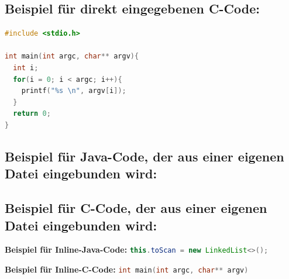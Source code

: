\subsection*{Beispiel für direkt eingegebenen C-Code:}

\begin{lstlisting}[language=c]
#include <stdio.h>

int main(int argc, char** argv){
  int i;
  for(i = 0; i < argc; i++){
    printf("%s \n", argv[i]);
  }
  return 0;
}
\end{lstlisting}


\subsection*{Beispiel für Java-Code, der aus einer eigenen Datei eingebunden wird:}



\subsection*{Beispiel für C-Code, der aus einer eigenen Datei eingebunden wird:}




\textbf{Beispiel für Inline-Java-Code:} \lstinline[language=java]|this.toScan = new LinkedList<>();|

\textbf{Beispiel für Inline-C-Code:} \lstinline[language=c]|int main(int argc, char** argv)|

